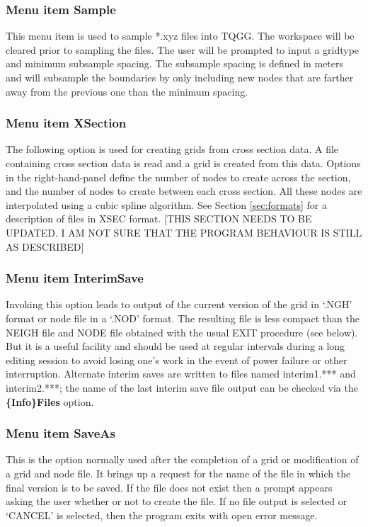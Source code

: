 \documentclass{article}
\begin{document}
\subsubsection[Menu item Sample]{Menu item Sample}
This menu item is used to sample *.xyz files into TQGG. The workspace will be cleared prior to sampling the files.
The user will be prompted to input a gridtype and minimum subsample spacing. The subsample spacing is defined in meters and will subsample the boundaries by only including new nodes that are farther away from the previous one than the minimum spacing.

\subsubsection[Menu item CrossSection]{Menu item XSection}
The following option is used for creating grids from cross section data. A file containing cross section data is read and a grid is created from this data. Options in the right-hand-panel define the number of nodes to create across the section, and the number of nodes to create between each cross section. All these nodes are interpolated using a cubic spline algorithm. See Section \ref{sec:formats} for a description of files in XSEC format.  [THIS SECTION NEEDS TO BE UPDATED.  I AM NOT SURE THAT THE PROGRAM BEHAVIOUR IS STILL AS DESCRIBED]

\subsubsection[Menu item InterimSave]{Menu item InterimSave}
Invoking this option leads to output of the current version of the grid in `.NGH' format or node file in a `.NOD' format. The resulting file is less compact than the NEIGH file and NODE file obtained with the usual EXIT procedure (see below). But it is a useful facility and should be used at regular intervals during a long editing session to avoid losing one's work in the event of power failure or other interruption. Alternate interim saves are written to files named interim1.*** and interim2.***; the name of the last interim save file output can be checked via the \textbf{\{Info\}Files} option.

\subsubsection[Menu item SaveAs]{Menu item SaveAs}
This is the option normally used after the completion of a grid or modification of a grid and node file. It brings up a request for the name of the file in which the final version is to be saved. If the file does not exist then a prompt appears asking the user whether or not to create the file. If no file output is selected or `CANCEL' is selected, then the program exits with open error message.
\end{document}
